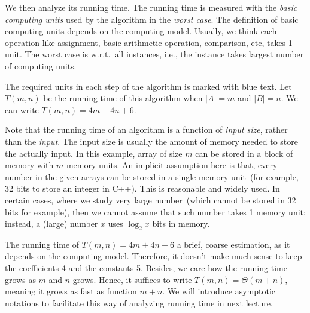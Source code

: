 \begin{minipage}{0.8\textwidth}
	\xxx
	\xxx
	\xxx
	\xxx
	\xxx
	\xxx
	\xxx
	\xxx
	\xxx
	\xxx
	\xxx
	\xxx
	\xxx
	\xxx
	\xxx
\end{minipage}

We then analyze its running time.
The running time is measured with the \emph{basic computing units} used by the algorithm in the \emph{worst case}.
The definition of basic computing units depends on the computing model. Usually, we think each operation like assignment, basic arithmetic operation, comparison, etc,
takes 1 unit. The worst case is w.r.t.\ all instances, i.e., the instance takes largest number of computing units.

The required units in each step of the algorithm is marked with blue text. 
Let $T(m,n)$ be the running time of this algorithm when $|A| = m$ and $|B| = n$.
We can write $T(m,n) = 4m + 4n + 6$.  

Note that the running time of an algorithm is a function of \emph{input size}, rather than the \emph{input}.
The input size is usually the amount of memory needed to store the actually input.
In this example, array of size $m$ can be stored in a block of memory with $m$ memory units.
An implicit assumption here is that, every number in the given arrays can be
stored in a single memory unit~(for example, 32 bits to store an integer in C++).
This is reasonable and widely used. In certain cases, where we study very large number~(which cannot be stored in 32 bits for example),
then we cannot assume that such number takes 1 memory unit; instead, a (large) number $x$ uses $\log_2 x$ bits in memory.

The running time of $T(m,n) = 4m + 4n + 6$ a brief, coarse estimation, as it depends on the computing model.  
Therefore, it doesn't make much sense to keep the coefficients 4 and the constants 5.
Besides, we care how the running time grows as $m$ and $n$ grows.
Hence, it suffices to write $T(m,n) = \Theta(m + n)$, meaning it grows as fast as function $m + n$.
We will introduce asymptotic notations to facilitate this way of analyzing running time in next lecture.


